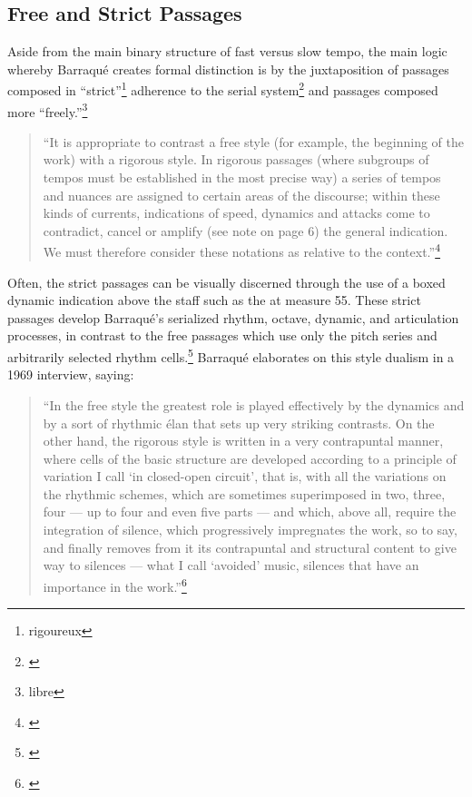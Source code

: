 \subsection{Free and Strict Passages}

Aside from the main binary structure of fast versus slow tempo, the main logic whereby Barraqué creates formal distinction is by the juxtaposition of passages composed in ``strict''\footnote{\guillemotleft rigoureux\guillemotright} adherence to the serial system\footnote{\citet[39]{barraque-griffiths}} and passages composed more ``freely.''\footnote{\guillemotleft libre\guillemotright}

\begin{quote}
    \singlespacing
    ``It is appropriate to contrast a free style (for example, the beginning of the work) with a rigorous style. In rigorous passages (where subgroups of tempos must be established in the most precise way) a series of tempos and nuances are assigned to certain areas of the discourse; within these kinds of currents, indications of speed, dynamics and attacks come to contradict, cancel or amplify (see note on page 6) the general indication. We must therefore consider these notations as relative to the context.''\footnote{\citet{barraque-score}}
\end{quote}

Often, the strict passages can be visually discerned through the use of a boxed dynamic indication above the staff such as the  at measure 55. These strict passages develop Barraqué's serialized rhythm, octave, dynamic, and articulation processes, in contrast to the free passages which use only the pitch series and arbitrarily selected rhythm cells.\footnote{\citet[41]{barraque-griffiths}} Barraqué elaborates on this style dualism in a 1969 interview, saying:

\begin{quote}
    \singlespacing
    ``In the free style the greatest role is played effectively by the dynamics and by a sort of rhythmic élan that sets up very striking contrasts. On the other hand, the rigorous style is written in a very contrapuntal manner, where cells of the basic structure are developed according to a principle of variation I call `in closed-open circuit', that is, with all the variations on the rhythmic schemes, which are sometimes superimposed in two, three, four — up to four and even five parts — and which, above all, require the integration of silence, which progressively impregnates the work, so to say, and finally removes from it its contrapuntal and structural content to give way to silences — what I call `avoided' music, silences that have an importance in the work.''\footnote{\citet[40]{barraque-griffiths}}
\end{quote}

